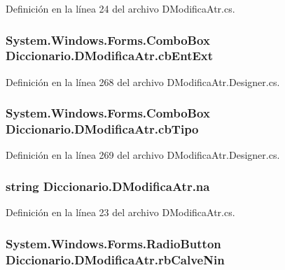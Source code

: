 Definición en la línea 24 del archivo D\-Modifica\-Atr.\-cs.

\hypertarget{class_diccionario_1_1_d_modifica_atr_a05f0a97003cb80ba751bd1afe3896f02}{
\subsubsection[{cb\-Ent\-Ext}]{\setlength{\rightskip}{0pt plus 5cm}System.\-Windows.\-Forms.\-Combo\-Box Diccionario.\-D\-Modifica\-Atr.\-cb\-Ent\-Ext}}\label{class_diccionario_1_1_d_modifica_atr_a05f0a97003cb80ba751bd1afe3896f02}


Definición en la línea 268 del archivo D\-Modifica\-Atr.\-Designer.\-cs.

\hypertarget{class_diccionario_1_1_d_modifica_atr_a2da36e4842e54585f5a38bff836ad5cd}{
\subsubsection[{cb\-Tipo}]{\setlength{\rightskip}{0pt plus 5cm}System.\-Windows.\-Forms.\-Combo\-Box Diccionario.\-D\-Modifica\-Atr.\-cb\-Tipo}}\label{class_diccionario_1_1_d_modifica_atr_a2da36e4842e54585f5a38bff836ad5cd}


Definición en la línea 269 del archivo D\-Modifica\-Atr.\-Designer.\-cs.

\hypertarget{class_diccionario_1_1_d_modifica_atr_aa1c71bfdad97a9519170ff060d3d6991}{
\subsubsection[{na}]{\setlength{\rightskip}{0pt plus 5cm}string Diccionario.\-D\-Modifica\-Atr.\-na}}\label{class_diccionario_1_1_d_modifica_atr_aa1c71bfdad97a9519170ff060d3d6991}


Definición en la línea 23 del archivo D\-Modifica\-Atr.\-cs.

\hypertarget{class_diccionario_1_1_d_modifica_atr_a151c61c3393029b48cd0b72cccdfd4e5}{
\subsubsection[{rb\-Calve\-Nin}]{\setlength{\rightskip}{0pt plus 5cm}System.\-Windows.\-Forms.\-Radio\-Button Diccionario.\-D\-Modifica\-Atr.\-rb\-Calve\-Nin}}\label{class_diccionario_1_1_d_modifica_atr_a151c61c3393029b48cd0b72cccdfd4e5}


